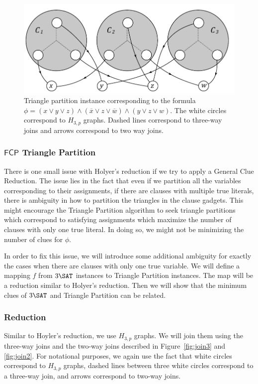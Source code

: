 \documentclass[runningheads,a4paper]{llncs}
\begin{document}
\begin{figure}
\label{fig:holyeroverview}
\centering
\includegraphics[width=\linewidth]{Holyer_reduction.pdf}
\caption{Triangle partition instance corresponding to the formula $\phi = (x \vee y \vee z) \wedge (\overline{x} \vee z \vee \overline{w}) \wedge (y \vee z \vee w)$. The white circles correspond to $H_{3,p}$ graphs. Dashed lines correspond to three-way joins and arrows correspond to two way joins.}
\end{figure}

\subsubsection{$\mathsf{FCP}$ Triangle Partition} 

There is one small issue with Holyer's reduction if we try to apply a General Clue Reduction. The issue lies in the fact that even if we partition all the variables corresponding to their assignments, if there are clauses with multiple true literals, there is ambiguity in how to partition the triangles in the clause gadgets. This might encourage the Triangle Partition algorithm to seek triangle partitions which correspond to satisfying assignments which maximize the number of clauses with only one true literal. In doing so, we might not be minimizing the number of clues for $\phi$.

In order to fix this issue, we will introduce some additional ambiguity for exactly the cases when there are clauses with only one true variable. We will define a mapping $f$ from $3\SAT$ instances to Triangle Partition instances. The map will be a reduction similar to Holyer's reduction. Then we will show that the minimum clues of $3\SAT$ and Triangle Partition can be related. 

\subsubsection{Reduction} Similar to Hoyler's reduction, we use $H_{3,p}$ graphs. We will join them using the three-way joins and the two-way joins described in Figure~\ref{fig:join3} and \ref{fig:join2}. For notational purposes, we again use the fact that white circles correspond to $H_{3,p}$ graphs, dashed lines between three white circles correspond to a three-way join, and arrows correspond to two-way joins.
\end{document}
